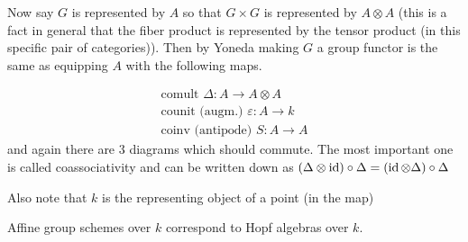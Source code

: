 \documentclass[12pt]{article}
\begin{document}
\hfill

Now say $G$ is represented by $A$ so that $G\times G$ is represented by $A\otimes A$ (this is a fact in general that the fiber product is represented by the tensor product (in this specific pair of categories)). Then by Yoneda making $G$ a group functor is the same as equipping $A$ with the following maps.

\begin{align*}
    \text{comult } \Delta:A\to A\otimes A \\
    \text{counit (augm.) }\varepsilon:A\to k \\
    \text{coinv (antipode) }S:A\to A
\end{align*} and again there are 3 diagrams which should commute. The most important one is called coassociativity and can be written down as $(\Delta\otimes\operatorname{id})\circ \Delta = (\operatorname{id}\otimes\Delta)\circ \Delta$

Also note that $k$ is the representing object of a point (in the  map)


\hfill
\begin{theorem}
    Affine group schemes over $k$ correspond to Hopf algebras over $k$.
\end{theorem}
\end{document}
